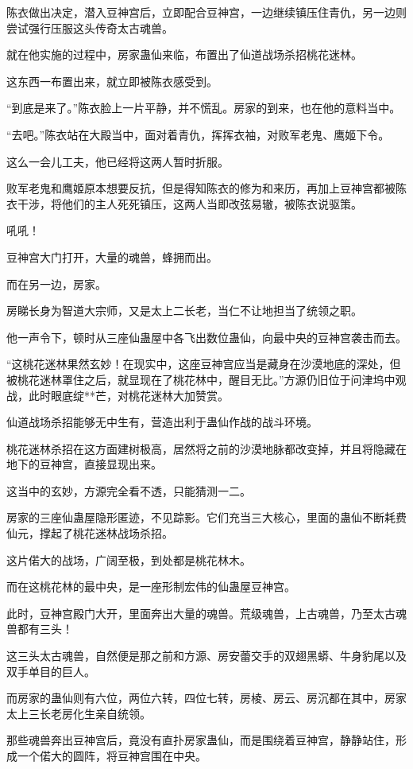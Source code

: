 \begin{this_body}
陈衣做出决定，潜入豆神宫后，立即配合豆神宫，一边继续镇压住青仇，另一边则尝试强行压服这头传奇太古魂兽。

就在他实施的过程中，房家蛊仙来临，布置出了仙道战场杀招桃花迷林。

这东西一布置出来，就立即被陈衣感受到。

“到底是来了。”陈衣脸上一片平静，并不慌乱。房家的到来，也在他的意料当中。

“去吧。”陈衣站在大殿当中，面对着青仇，挥挥衣袖，对败军老鬼、鹰姬下令。

这么一会儿工夫，他已经将这两人暂时折服。

败军老鬼和鹰姬原本想要反抗，但是得知陈衣的修为和来历，再加上豆神宫都被陈衣干涉，将他们的主人死死镇压，这两人当即改弦易辙，被陈衣说驱策。

吼吼！

豆神宫大门打开，大量的魂兽，蜂拥而出。

而在另一边，房家。

房睇长身为智道大宗师，又是太上二长老，当仁不让地担当了统领之职。

他一声令下，顿时从三座仙蛊屋中各飞出数位蛊仙，向最中央的豆神宫袭击而去。

“这桃花迷林果然玄妙！在现实中，这座豆神宫应当是藏身在沙漠地底的深处，但被桃花迷林罩住之后，就显现在了桃花林中，醒目无比。”方源仍旧位于问津坞中观战，此时眼底绽**芒，对桃花迷林大加赞赏。

仙道战场杀招能够无中生有，营造出利于蛊仙作战的战斗环境。

桃花迷林杀招在这方面建树极高，居然将之前的沙漠地脉都改变掉，并且将隐藏在地下的豆神宫，直接显现出来。

这当中的玄妙，方源完全看不透，只能猜测一二。

房家的三座仙蛊屋隐形匿迹，不见踪影。它们充当三大核心，里面的蛊仙不断耗费仙元，撑起了桃花迷林战场杀招。

这片偌大的战场，广阔至极，到处都是桃花林木。

而在这桃花林的最中央，是一座形制宏伟的仙蛊屋豆神宫。

此时，豆神宫殿门大开，里面奔出大量的魂兽。荒级魂兽，上古魂兽，乃至太古魂兽都有三头！

这三头太古魂兽，自然便是那之前和方源、房安蕾交手的双翅黑蟒、牛身豹尾以及双手单目的巨人。

而房家的蛊仙则有六位，两位六转，四位七转，房棱、房云、房沉都在其中，房家太上三长老房化生亲自统领。

那些魂兽奔出豆神宫后，竟没有直扑房家蛊仙，而是围绕着豆神宫，静静站住，形成一个偌大的圆阵，将豆神宫围在中央。


\end{this_body}
